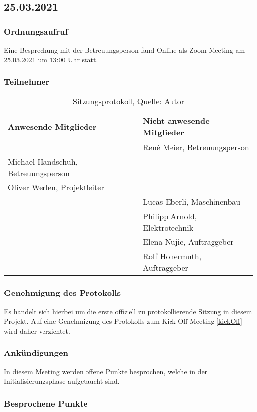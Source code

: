 \subsection{25.03.2021}\label{Beteuermeeting2}
\subsubsection{Ordnungsaufruf}
Eine Besprechung mit der Betreuungsperson fand Online als Zoom-Meeting am 25.03.2021 um 13:00 Uhr statt. 
\subsubsection{Teilnehmer}
\begin{table}[H]
	\setlength\extrarowheight{2pt} %
	\begin{tabularx}{\textwidth}{|X|X|}
		\hline
		\textbf{Anwesende Mitglieder} &  \textbf{Nicht anwesende Mitglieder} \\
		\hline
		& René Meier, Betreuungsperson  \\
		 Michael Handschuh, Betreuungsperson &   \\
		Oliver Werlen, Projektleiter &\\
		&Lucas Eberli, Maschinenbau  \\
		&Philipp Arnold, Elektrotechnik \\
		&Elena Nujic, Auftraggeber \\
		&Rolf Hohermuth, Auftraggeber \\
		\hline
	\end{tabularx}
	\caption{ \label{tbl: Teilnehmerliste vom 25.03.2021}Sitzungsprotokoll, Quelle: Autor}
\end{table}
\subsubsection{Genehmigung des Protokolls}
Es handelt sich hierbei um die erste offiziell zu protokollierende Sitzung in diesem Projekt. Auf eine Genehmigung des Protokolls zum Kick-Off Meeting \ref{kickOff} wird daher verzichtet. 
\subsubsection{Ankündigungen}
In diesem Meeting werden offene Punkte besprochen, welche in der Initialisierungsphase aufgetaucht sind. 
\subsubsection{Besprochene Punkte}
